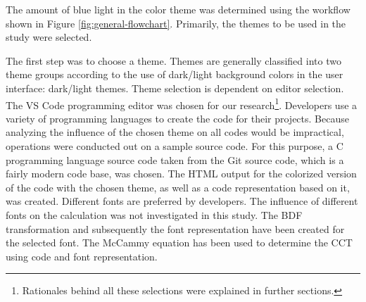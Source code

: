 \documentclass{article}
\begin{document}
The amount of blue light in the color theme was determined using the workflow shown in Figure
\ref{fig:general-flowchart}. Primarily, the themes to be used in the study were selected.

The first step was to choose a theme. Themes are generally classified into two theme groups according to the use of dark/light background colors in the user interface: dark/light themes.  Theme selection is dependent on editor selection. The VS Code programming editor was chosen for our research\footnote{Rationales behind all these selections were explained in further sections.}. Developers use a variety of programming languages to create the code for their projects. Because analyzing the influence of the chosen theme on all codes would be impractical, operations were conducted out on a sample source code. For this purpose, a C programming language source code taken from the Git source code, which is a fairly modern code base, was chosen. The HTML output for the colorized version of the code with the chosen theme, as well as a code representation based on it, was created. Different fonts are preferred by developers. The influence of different fonts on the calculation was not investigated in this study. The BDF transformation and subsequently the font representation have been created for the selected font. The McCammy equation has been used to determine the CCT using code and font representation.

\begin{comment}
The flow of transactions taking place in the analysis is presented below, each of which is detailed in the relevant sections. As can be seen in this flowchart, all the coloring themes chosen for a single source code and font sample (bk. \ref{sec:material-methods.inputs})  are kept constant as analysis input is handled separately.
\end{comment}
\end{document}
